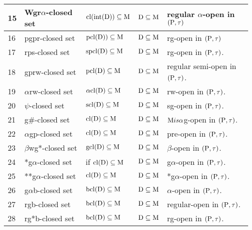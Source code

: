 {\begin{longtable}{@{}|p{.9cm}|>{\raggedright}p{5cm}|>{\centering}p{2.5cm}|>{\centering}p{1.7cm}|>{\centering}p{2.8cm}|@{}}
\hline
15 & Wgr$\alpha$-closed set \cite{Janaki1} & $\mathrm{cl}(\mbox{int}(\mathrm{D})) \subseteq \mathrm{M}$ & $\mathrm{D} \subseteq \mathrm{M}$ & regular $\alpha$-open in $(\mathrm{P}, \tau)$\tabularnewline
\hline
16 & pgpr-closed set \cite{Anitha} & $\mathrm{pcl}(\mathrm{D})) \subseteq \mathrm{M}$ & $\mathrm{D} \subseteq \mathrm{M}$ & rg-open in $(\mathrm{P}, \tau)$\tabularnewline
\hline
17 & rps-closed set \cite{Shyala} & $\mathrm{spcl}(\mathrm{D}) \subseteq \mathrm{M}$ & $\mathrm{D} \subseteq \mathrm{M}$ & rg-open in $(\mathrm{P}, \tau)$.\tabularnewline
\hline
18 & gprw-closed set \cite{Sanjay1} & $\mathrm{pcl}(\mathrm{D}) \subseteq \mathrm{M}$ & $\mathrm{D} \subseteq \mathrm{M}$ & regular semi-open in $(\mathrm{P}, \tau)$.\tabularnewline
\hline
19 & $\alpha$rw-closed set \cite{Wali3} & $\alpha\mathrm{cl}(\mathrm{D}) \subseteq \mathrm{M}$ & $\mathrm{D}\subseteq\mathrm{M}$ & rw-open in $(\mathrm{P}, \tau)$.\tabularnewline
\hline
20 & $\psi$-closed set \cite{Veerakumar2} & $\mathrm{scl}(\mathrm{D}) \subseteq \mathrm{M}$ & $\mathrm{D} \subseteq \mathrm{M}$ & sg-open in $(\mathrm{P}, \tau)$.\tabularnewline
\hline
21 & g\#-closed set \cite{Veerakumar} & $\mathrm{cl}(\mathrm{D}) \subseteq \mathrm{M}$ & $\mathrm{D} \subseteq \mathrm{M}$ & $\mathrm{M} is \alpha$g-open in $(\mathrm{P}, \tau)$.\tabularnewline
\hline
22 & $\alpha$gp-closed set \cite{Navalagi2} & $\mathrm{cl}(\mathrm{D}) \subseteq \mathrm{M}$ & $\mathrm{D} \subseteq \mathrm{M}$ & pre-open in $(\mathrm{P}, \tau)$.\tabularnewline
\hline
23 & $\beta$wg*-closed set \cite{Dhanapakyam} & $\mathrm{gcl}(\mathrm{D}) \subseteq \mathrm{M}$ & $\mathrm{D} \subseteq \mathrm{M}$ & $\beta$-open in $(\mathrm{P}, \tau)$.\tabularnewline
\hline
24 & *g$\alpha$-closed set \cite{Vigneshwaran} & if $\mathrm{cl}(\mathrm{D}) \subseteq \mathrm{M}$ & $\mathrm{D} \subseteq \mathrm{M}$ & g$\alpha$-open in $(\mathrm{P},\tau)$.\tabularnewline
\hline
25 & {*}{*}g$\alpha$-closed set \cite{Vigneshwaran1} & $\mathrm{cl}(\mathrm{D}) \subseteq \mathrm{M}$ & $\mathrm{D} \subseteq \mathrm{M}$ & *g$\alpha$-open in $(\mathrm{P}, \tau)$.\tabularnewline
\hline
26 & g$\alpha$b-closed set \cite{Nagaveni7} & $\mathrm{bcl}(\mathrm{D}) \subseteq \mathrm{M}$ & $\mathrm{D} \subseteq \mathrm{M}$ & $\alpha$-open in $(\mathrm{P}, \tau)$.\tabularnewline
\hline
27 & rgb-closed set \cite{Mariappa} & $\mathrm{bcl}(\mathrm{D}) \subseteq \mathrm{M}$ & $\mathrm{D} \subseteq \mathrm{M}$ & regular-open in $(\mathrm{P}, \tau)$.\tabularnewline
\hline
28 & rg*b-closed set \cite{Indirani} & $\mathrm{bcl}(\mathrm{D}) \subseteq \mathrm{M}$ & $\mathrm{D} \subseteq \mathrm{M}$ & rg-open in $(\mathrm{P}, \tau)$.\tabularnewline

\end{longtable}}
